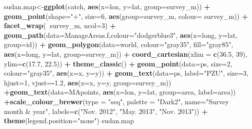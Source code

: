 \documentclass[]{article}
\newenvironment{Shaded}{\begin{snugshade}}{\end{snugshade}}
\newcommand{\KeywordTok}[1]{\textcolor[rgb]{0.13,0.29,0.53}{\textbf{#1}}}
\newcommand{\DataTypeTok}[1]{\textcolor[rgb]{0.13,0.29,0.53}{#1}}
\newcommand{\DecValTok}[1]{\textcolor[rgb]{0.00,0.00,0.81}{#1}}
\newcommand{\FloatTok}[1]{\textcolor[rgb]{0.00,0.00,0.81}{#1}}
\newcommand{\StringTok}[1]{\textcolor[rgb]{0.31,0.60,0.02}{#1}}
\newcommand{\OperatorTok}[1]{\textcolor[rgb]{0.81,0.36,0.00}{\textbf{#1}}}
\newcommand{\NormalTok}[1]{#1}
\begin{document}
\begin{Shaded}
\begin{Highlighting}[]
\NormalTok{sudan.map<-}\KeywordTok{ggplot}\NormalTok{(catch, }\KeywordTok{aes}\NormalTok{(}\DataTypeTok{x=}\NormalTok{lon, }\DataTypeTok{y=}\NormalTok{lat, }\DataTypeTok{group=}\NormalTok{survey_m)) }\OperatorTok{+}\StringTok{ }\KeywordTok{geom_point}\NormalTok{(}\DataTypeTok{shape=}\StringTok{"+"}\NormalTok{, }\DataTypeTok{size=}\DecValTok{6}\NormalTok{, }\KeywordTok{aes}\NormalTok{(}\DataTypeTok{group=}\NormalTok{survey_m, }\DataTypeTok{colour=}\NormalTok{ survey_m)) }\OperatorTok{+}\StringTok{ }\KeywordTok{facet_wrap}\NormalTok{(}\OperatorTok{~}\NormalTok{survey_m, }\DataTypeTok{ncol=}\DecValTok{3}\NormalTok{) }\OperatorTok{+}\StringTok{ }\KeywordTok{geom_path}\NormalTok{(}\DataTypeTok{data=}\NormalTok{ManageAreas.f,}\DataTypeTok{colour=}\StringTok{"dodgerblue3"}\NormalTok{, }\KeywordTok{aes}\NormalTok{(}\DataTypeTok{x=}\NormalTok{long, }\DataTypeTok{y=}\NormalTok{lat, }\DataTypeTok{group=}\NormalTok{id)) }\OperatorTok{+}\StringTok{ }\KeywordTok{geom_polygon}\NormalTok{(}\DataTypeTok{data=}\NormalTok{world, }\DataTypeTok{colour=}\StringTok{"gray35"}\NormalTok{, }\DataTypeTok{fill=}\StringTok{"gray85"}\NormalTok{, }\KeywordTok{aes}\NormalTok{(}\DataTypeTok{x=}\NormalTok{long, }\DataTypeTok{y=}\NormalTok{lat, }\DataTypeTok{group=}\NormalTok{survey_m)) }\OperatorTok{+}\StringTok{  }\KeywordTok{coord_cartesian}\NormalTok{(}\DataTypeTok{xlim =} \KeywordTok{c}\NormalTok{(}\FloatTok{36.5}\NormalTok{, }\DecValTok{39}\NormalTok{), }\DataTypeTok{ylim=}\KeywordTok{c}\NormalTok{(}\FloatTok{17.7}\NormalTok{, }\FloatTok{22.5}\NormalTok{)) }\OperatorTok{+}\StringTok{ }\KeywordTok{theme_classic}\NormalTok{() }\OperatorTok{+}\StringTok{ }\KeywordTok{geom_point}\NormalTok{(}\DataTypeTok{data=}\NormalTok{ps, }\DataTypeTok{size=}\DecValTok{2}\NormalTok{, }\DataTypeTok{colour=}\StringTok{"gray35"}\NormalTok{, }\KeywordTok{aes}\NormalTok{(}\DataTypeTok{x=}\NormalTok{x, }\DataTypeTok{y=}\NormalTok{y)) }\OperatorTok{+}\StringTok{ }\KeywordTok{geom_text}\NormalTok{(}\DataTypeTok{data=}\NormalTok{ps, }\DataTypeTok{label=}\StringTok{"PZU"}\NormalTok{, }\DataTypeTok{size=}\DecValTok{3}\NormalTok{,  }\DataTypeTok{hjust=}\DecValTok{1}\NormalTok{, }\DataTypeTok{vjust=}\OperatorTok{-}\FloatTok{1.2}\NormalTok{,  }\KeywordTok{aes}\NormalTok{(}\DataTypeTok{x=}\NormalTok{x, }\DataTypeTok{y=}\NormalTok{y, }\DataTypeTok{group=}\NormalTok{survey_m)) }\OperatorTok{+}\KeywordTok{geom_text}\NormalTok{(}\DataTypeTok{data=}\NormalTok{MApoints, }\KeywordTok{aes}\NormalTok{(}\DataTypeTok{x=}\NormalTok{lon, }\DataTypeTok{y=}\NormalTok{lat, }\DataTypeTok{group=}\NormalTok{area, }\DataTypeTok{label=}\NormalTok{area)) }\OperatorTok{+}\KeywordTok{scale_colour_brewer}\NormalTok{(}\DataTypeTok{type =} \StringTok{"seq"}\NormalTok{, }\DataTypeTok{palette =} \StringTok{"Dark2"}\NormalTok{, }\DataTypeTok{name=}\StringTok{"Survey month & year"}\NormalTok{, }\DataTypeTok{labels=}\KeywordTok{c}\NormalTok{(}\StringTok{"Nov. 2012"}\NormalTok{, }\StringTok{"May. 2013"}\NormalTok{, }\StringTok{"Nov. 2013"}\NormalTok{)) }\OperatorTok{+}\StringTok{ }\KeywordTok{theme}\NormalTok{(}\DataTypeTok{legend.position=}\StringTok{"none"}\NormalTok{)}
\NormalTok{sudan.map}
\end{Highlighting}
\end{Shaded}
\end{document}
